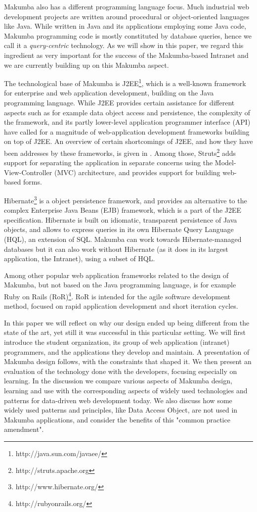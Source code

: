 \documentclass{llncs}
\begin{document}
Makumba also has a different programming language focus. Much industrial web development projects are written around procedural or object-oriented languages like  Java. While written in Java and its applications employing some Java code, Makumba programming code is mostly constituted by database queries, hence we call it a \textit{query-centric} technology. As we will show in this paper, we regard this ingredient as very important for the success of the Makumba-based Intranet and we are currently building up on this Makumba aspect.

The technological base of Makumba is J2EE\footnote{http://java.sun.com/javaee/}, which is a well-known framework for enterprise and web application development, building on the Java programming language. While J2EE provides certain assistance for different aspects such as for example data object access and persistence, the complexity of the framework, and its partly lower-level application programmer interface (API) have called for a magnitude of web-application development frameworks building on top of J2EE. An overview of certain shortcomings of J2EE, and how they have been addresses by these frameworks, is given in \cite{johnson2005jdf}. Among those, Struts\footnote{http://struts.apache.org} adds support for separating the application in separate concerns using the Model-View-Controller (MVC) architecture, and provides support for building web-based forms. 

Hibernate\footnote{http://www.hibernate.org/} is a object persistence framework, and provides an alternative to the complex Enterprise Java Beans (EJB) framework, which is a part of the J2EE specification. Hibernate is built on idiomatic, transparent persistence of Java objects, and allows to express queries in its own Hibernate Query Language (HQL), an extension of SQL. Makumba can work towards Hibernate-managed databases but it can also work without Hibernate (as it does in its largest application, the Intranet), using a subset of HQL.

Among other popular web application frameworks related to the design of Makumba, but not based on the Java programming language, is for example Ruby on Rails (RoR)\footnote{http://rubyonrails.org/}. RoR is intended for the agile software development method, focused on rapid application development and short iteration cycles.

In this paper we will  reflect on why our design ended up being different from the state of the art, yet still it was successful in this particular setting. We will first introduce the student organization, its group of web application (intranet) programmers, and the applications they develop and maintain. A presentation of Makumba design follows, with the constraints that shaped it. We then present an evaluation of the technology done with the developers, focusing especially on learning. In the discussion we compare various aspects of Makumba design, learning and use with the corresponding aspects of widely used technologies and patterns for data-driven web development today. We also discuss how some widely used patterns and principles, like Data Access Object, are not used in Makumba applications, and consider the benefits of this "common practice amendment".
\end{document}
